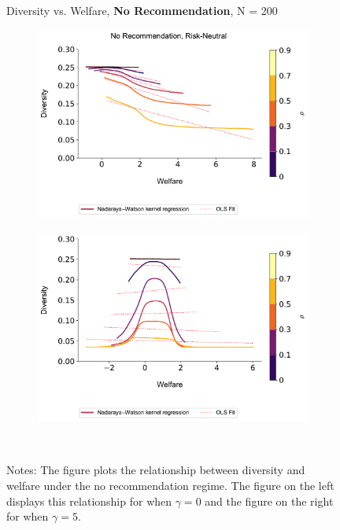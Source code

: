 \documentclass[format=acmsmall, review=false]{acmart}
\begin{document}
\addtocounter{figure}{-1}
\begin{figure}[ht]
\caption{Diversity vs. Welfare, \textbf{No Recommendation}, N = 200}
\begin{subfigure}{.45\textwidth}
\includegraphics[width=1.0\linewidth]{figures/diversity_welfare_rn_n_200.pdf}
\end{subfigure}
\begin{subfigure}{.45\textwidth}
\includegraphics[width=1.0\linewidth]{figures/diversity_welfare_ra_n_200.pdf}
\end{subfigure}\\
\caption*{\scriptsize Notes: The figure plots the relationship between diversity and welfare under the no recommendation regime. The figure on the left displays this relationship for when $\gamma = 0$ and the figure on the right for when $\gamma = 5$.}\label{fig:diversity_welfare_ra}
\end{figure}
\end{document}
